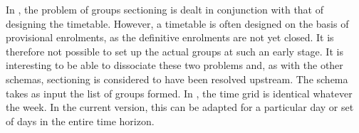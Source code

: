 In \cite{2022_barichard_PATAT}, the problem of groups sectioning is dealt in conjunction with that of designing the timetable. However, a timetable is often designed on the basis of provisional enrolments, as the definitive enrolments are not yet closed. It is therefore not possible to set up the actual groups at such an early stage. It is interesting to be able to dissociate these two problems and, as with the other schemas, sectioning is considered to have been resolved upstream. The \UTP{} schema takes as input the list of groups formed. %
In \cite{2022_barichard_PATAT}, the time grid is identical whatever the week. In the current version, this can be adapted for a particular day or set of days in the entire time horizon.



